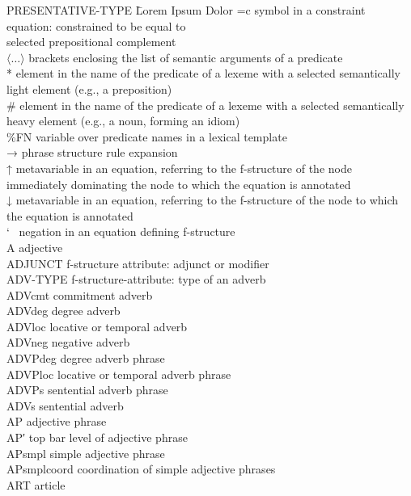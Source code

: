 \documentclass[output=paper]{langsci/langscibook}
\begin{document}
\begin{tabbing}
PRESENTATIVE-TYPE \= Lorem Ipsum Dolor \kill
=c \> symbol in a constraint equation: constrained to be equal to\\
\relax[P + O] \> selected prepositional complement\\
$\langle\ldots\rangle$ \> brackets enclosing the list of semantic arguments of a predicate\\
* \> element in the name of the predicate of a lexeme with a selected semantically light element (e.g., a preposition)\\
\# \> element in the name of the predicate of a lexeme with a selected semantically heavy element (e.g., a noun, forming an idiom)\\
\%FN \> variable over predicate names in a lexical template\\
→ \> phrase structure rule expansion\\
↑ \> metavariable in an equation, referring to the f-structure of the node immediately dominating the node to which the equation is annotated\\
↓ \> metavariable in an equation, referring to the f-structure of the node to which the equation is annotated\\
\char`~ \> negation in an equation defining f-structure\\
A \> adjective\\
ADJUNCT \> f-structure attribute: adjunct or modifier\\
ADV-TYPE \> f-structure-attribute: type of an adverb\\
ADVcmt \> commitment adverb\\
ADVdeg \> degree adverb\\
ADVloc \> locative or temporal adverb\\
ADVneg \> negative adverb\\
ADVPdeg \> degree adverb phrase\\
ADVPloc \> locative or temporal adverb phrase\\
ADVPs \> sentential adverb phrase\\
ADVs \> sentential adverb\\
AP \> adjective phrase\\
AP′ \> top bar level of adjective phrase\\
APsmpl \> simple adjective phrase\\
APsmplcoord \> coordination of simple adjective phrases\\
ART \> article\\

\end{tabbing}
\end{document}
